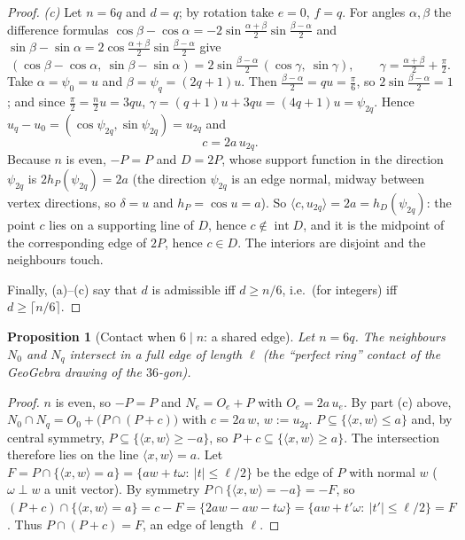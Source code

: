 \documentclass[11pt,a4paper]{article}
\newtheorem{proposition}[theorem]{Proposition}
\theoremstyle{definition}
\theoremstyle{remark}
\newcommand{\inter}{\operatorname{int}}
\newcommand{\ip}[2]{\langle #1,#2\rangle}
\begin{document}
\begin{proof}
\emph{(c)} Let $n=6q$ and $d=q$; by rotation take $e=0$, $f=q$. For angles $\alpha,\beta$ the difference formulas $\cos\beta-\cos\alpha=-2\sin\frac{\alpha+\beta}2\sin\frac{\beta-\alpha}2$ and $\sin\beta-\sin\alpha=2\cos\frac{\alpha+\beta}2\sin\frac{\beta-\alpha}2$ give
\[
(\cos\beta-\cos\alpha,\ \sin\beta-\sin\alpha)=2\sin\tfrac{\beta-\alpha}2\,(\cos\gamma,\ \sin\gamma),\qquad\gamma=\tfrac{\alpha+\beta}2+\tfrac\pi2 .
\]
Take $\alpha=\psi_0=u$ and $\beta=\psi_q=(2q+1)u$. Then $\tfrac{\beta-\alpha}2=qu=\tfrac\pi6$, so $2\sin\frac{\beta-\alpha}2=1$; and since $\tfrac\pi2=\tfrac n2u=3qu$, $\gamma=(q+1)u+3qu=(4q+1)u=\psi_{2q}$.
Hence $u_q-u_0=(\cos\psi_{2q},\sin\psi_{2q})=u_{2q}$ and
\[
c=2a\,u_{2q}.
\]
Because $n$ is even, $-P=P$ and $D=2P$, whose support function in the direction $\psi_{2q}$ is $2h_P(\psi_{2q})=2a$ (the direction $\psi_{2q}$ is an edge normal, midway between vertex directions, so $\delta=u$ and $h_P=\cos u=a$).
So $\ip{c}{u_{2q}}=2a=h_D(\psi_{2q})$: the point $c$ lies on a supporting line of $D$, hence $c\notin\inter D$, and it is the midpoint of the corresponding edge of $2P$, hence $c\in D$. The interiors are disjoint and the neighbours touch.

Finally, (a)--(c) say that $d$ is admissible iff $d\ge n/6$, i.e.\ (for integers) iff $d\ge\lceil n/6\rceil$.
\end{proof}

\begin{proposition}[Contact when $6\mid n$: a shared edge]\label{prop:shared}
Let $n=6q$. The neighbours $N_0$ and $N_q$ intersect in a full edge of length $\ell$ (the ``perfect ring'' contact of the GeoGebra drawing of the $36$-gon).
\end{proposition}
\begin{proof}
$n$ is even, so $-P=P$ and $N_e=O_e+P$ with $O_e=2a\,u_e$. By part (c) above, $N_0\cap N_q=O_0+\big(P\cap(P+c)\big)$ with $c=2a\,w$, $w:=u_{2q}$.
$P\subseteq\{\ip{x}{w}\le a\}$ and, by central symmetry, $P\subseteq\{\ip{x}{w}\ge-a\}$, so $P+c\subseteq\{\ip{x}{w}\ge a\}$. The intersection therefore lies on the line $\ip{x}{w}=a$.
Let $F=P\cap\{\ip{x}{w}=a\}=\{aw+t\omega:\ |t|\le\ell/2\}$ be the edge of $P$ with normal $w$ ($\omega\perp w$ a unit vector). By symmetry $P\cap\{\ip{x}{w}=-a\}=-F$, so
$(P+c)\cap\{\ip{x}{w}=a\}=c-F=\{2aw-aw-t\omega\}=\{aw+t'\omega:\ |t'|\le\ell/2\}=F$. Thus $P\cap(P+c)=F$, an edge of length $\ell$.
\end{proof}
\end{document}
